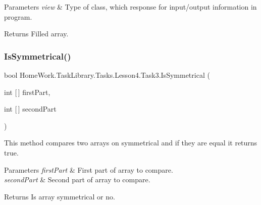 \begin{DoxyParams}{Parameters}
{\em view} & Type of class, which response for input/output information in program.\\
\hline
\end{DoxyParams}
\begin{DoxyReturn}{Returns}
Filled array.
\end{DoxyReturn}
\mbox{\label{class_home_work_1_1_task_library_1_1_tasks_1_1_lesson4_1_1_task3_a24a7e15b38e01f3223697ec1351c0db4}} 
\subsubsection{\texorpdfstring{IsSymmetrical()}{IsSymmetrical()}}
{\footnotesize\ttfamily bool Home\+Work.\+Task\+Library.\+Tasks.\+Lesson4.\+Task3.\+Is\+Symmetrical (\begin{DoxyParamCaption}\item[{int \mbox{[}$\,$\mbox{]}}]{first\+Part,  }\item[{int \mbox{[}$\,$\mbox{]}}]{second\+Part }\end{DoxyParamCaption})\hspace{0.3cm}{\ttfamily [private]}}



This method compares two arrays on symmetrical and if they are equal it returns true. 


\begin{DoxyParams}{Parameters}
{\em first\+Part} & First part of array to compare.\\
\hline
{\em second\+Part} & Second part of array to compare.\\
\hline
\end{DoxyParams}
\begin{DoxyReturn}{Returns}
Is array symmetrical or no.
\end{DoxyReturn}
\mbox{\label{class_home_work_1_1_task_library_1_1_tasks_1_1_lesson4_1_1_task3_acb762facf6fac2e51dbda523daffd971}} 
